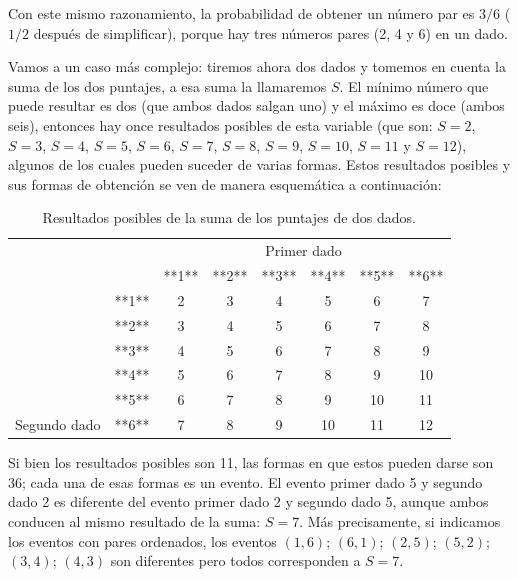 \documentclass[]{book}
\begin{document}
Con este mismo razonamiento, la probabilidad de obtener un número par es
\(3/6\) (\(1/2\) después de simplificar), porque hay tres números pares (2, 4 y
6) en un dado.

Vamos a un caso más complejo: tiremos ahora dos dados y tomemos en
cuenta la suma de los dos puntajes, a esa suma la llamaremos \(S\). El
mínimo número que puede resultar es dos (que ambos dados salgan uno) y
el máximo es doce (ambos seis), entonces hay once resultados posibles de
esta variable (que son: \(S = 2\), \(S = 3\), \(S = 4\), \(S = 5\), \(S = 6\), \(S = 7\), \(S = 8\),
\(S = 9\), \(S = 10\), \(S = 11\) y \(S = 12\)), algunos de los cuales pueden suceder de
varias formas. Estos resultados posibles y sus formas de obtención se
ven de manera esquemática a continuación:

\begin{table}

\caption{\label{tab:unnamed-chunk-216}Resultados posibles de la suma de los puntajes de dos dados.}
\centering
\begin{tabular}[t]{lccccccc}
\toprule
\multicolumn{2}{c}{ } & \multicolumn{6}{c}{Primer dado} \\
\cmidrule(l{3pt}r{3pt}){3-8}
 &  & **1** & **2** & **3** & **4** & **5** & **6**\\
\midrule
\rowcolor{gray!6}   & **1** & 2 & 3 & 4 & 5 & 6 & 7\\
\cmidrule{2-8}
 & **2** & 3 & 4 & 5 & 6 & 7 & 8\\
\cmidrule{2-8}
\rowcolor{gray!6}   & **3** & 4 & 5 & 6 & 7 & 8 & 9\\
\cmidrule{2-8}
 & **4** & 5 & 6 & 7 & 8 & 9 & 10\\
\cmidrule{2-8}
\rowcolor{gray!6}   & **5** & 6 & 7 & 8 & 9 & 10 & 11\\
\cmidrule{2-8}
\multirow[t]{-6}{*}{\raggedright\arraybackslash Segundo dado} & **6** & 7 & 8 & 9 & 10 & 11 & 12\\
\bottomrule
\end{tabular}
\end{table}

Si bien los resultados posibles son 11, las formas en que estos pueden
darse son 36; cada una de esas formas es un evento. El evento primer
dado 5 y segundo dado 2 es diferente del evento primer dado 2 y segundo
dado 5, aunque ambos conducen al mismo resultado de la suma: \(S=7\). Más precisamente,
si indicamos los eventos con pares ordenados, los eventos \((1,6)\); \((6,1)\);
\((2,5)\); \((5,2)\); \((3,4)\); \((4,3)\) son diferentes pero todos corresponden a \(S=7\).
\end{document}
